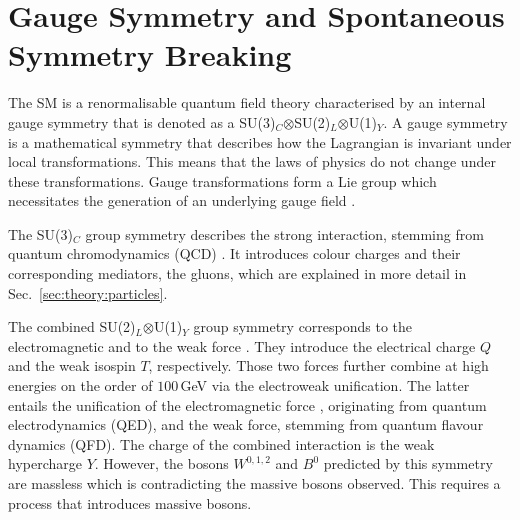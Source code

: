 \documentclass[bachelor,ngerman,english]{GAUBM}
\begin{document}
\section{Gauge Symmetry and Spontaneous Symmetry Breaking}
\label{sec:theory:gauge_symmetry_and_higgs_meachanism}
The SM is a renormalisable quantum field theory \cite{theory:quantum_fields} characterised by an internal gauge symmetry that is denoted as a SU(3)$_C$$\otimes$SU(2)$_L$$\otimes$U(1)$_Y$. A gauge symmetry is a mathematical symmetry that describes how the Lagrangian is invariant under local transformations. This means that the laws of physics do not change under these transformations. Gauge transformations form a Lie group \cite{theory:lie_groups} which necessitates the generation of an underlying gauge field \cite{theory:gauge_fields}.


The SU(3)$_C$ group symmetry describes the strong interaction, stemming from quantum chromodynamics (QCD) \cite{theory:qcd_01,theory:qcd_02,theory:qcd_03,theory:qcd_04,theory:qcd_05}. It introduces colour charges and their corresponding mediators, the gluons, which are explained in more detail in Sec.~\ref{sec:theory:particles}.

The combined SU(2)$_L$$\otimes$U(1)$_Y$ group symmetry corresponds to the electromagnetic and to the weak force \cite{theory:qed_01,theory:qed_02,theory:qed_03,theory:qed_04,theory:qed_05}. They introduce the electrical charge $Q$ and the weak isospin $T$, respectively. Those two forces further combine at high energies on the order of $100$\,GeV via the electroweak unification. The latter entails the unification of the electromagnetic force \cite{theory:qed_01,theory:qed_02,theory:qed_03,theory:qed_04,theory:qed_05,theory:electroweak_01,theory:electroweak_02,theory:electroweak_03}, originating from quantum electrodynamics (QED), and the weak force, stemming from quantum flavour dynamics (QFD). The charge of the combined interaction is the weak hypercharge $Y$. However, the bosons $W^{0,1,2}$ and $B^0$ predicted by this symmetry are massless which is contradicting the massive bosons observed. This requires a process that introduces massive bosons. 
\end{document}

